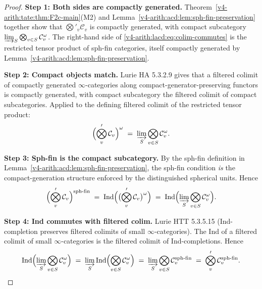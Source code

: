 \begin{proof}
\textbf{Step 1: Both sides are compactly generated.}
Theorem~\ref{v4-arith:tate:thm:F2c-main}(M2) and
Lemma~\ref{v4-arith:acd:lem:sph-fin-preservation} together show that
\(\bigotimes'_{v}\mathcal{C}_{v}\) is compactly generated, with compact
subcategory
\(\varinjlim_{S}\bigotimes_{v\in S}\mathcal{C}_{v}^{\omega}\). The
right-hand side of \eqref{v4-arith:lacd:eq:colim-commutes} is the
restricted tensor product of sph-fin categories, itself compactly
generated by Lemma~\ref{v4-arith:acd:lem:sph-fin-preservation}.

\textbf{Step 2: Compact objects match.} Lurie HA 5.3.2.9 gives that
a filtered colimit of compactly generated \(\infty\)-categories
along compact-generator-preserving functors is compactly generated,
with compact subcategory the filtered colimit of compact
subcategories. Applied to the defining filtered colimit of the
restricted tensor product:
\begin{equation}
\Bigl(\bigotimes_{v}^{\prime}\mathcal{C}_{v}\Bigr)^{\omega}
\;=\;\varinjlim_{S}\bigotimes_{v\in S}\mathcal{C}_{v}^{\omega}.
\end{equation}

\textbf{Step 3: Sph-fin is the compact subcategory.} By the sph-fin
definition in
Lemma~\ref{v4-arith:acd:lem:sph-fin-preservation}, the sph-fin condition
\emph{is} the compact-generation structure enforced by the
distinguished spherical units. Hence
\begin{equation}
\Bigl(\bigotimes_{v}^{\prime}\mathcal{C}_{v}\Bigr)^{\mathrm{sph\text{-}fin}}
\;=\;\mathrm{Ind}\Bigl(\bigl(\bigotimes_{v}^{\prime}\mathcal{C}_{v}\bigr)^{\omega}\Bigr)
\;=\;\mathrm{Ind}\Bigl(\varinjlim_{S}\bigotimes_{v\in S}\mathcal{C}_{v}^{\omega}\Bigr).
\end{equation}

\textbf{Step 4: Ind commutes with filtered colim.} Lurie HTT 5.3.5.15
(Ind-completion preserves filtered colimits of small
\(\infty\)-categories). The Ind of a filtered colimit of small
\(\infty\)-categories is the filtered colimit of Ind-completions.
Hence
\begin{equation}
\mathrm{Ind}\Bigl(\varinjlim_{S}\bigotimes_{v\in S}\mathcal{C}_{v}^{\omega}\Bigr)
\;=\;\varinjlim_{S}\mathrm{Ind}\Bigl(\bigotimes_{v\in S}\mathcal{C}_{v}^{\omega}\Bigr)
\;=\;\varinjlim_{S}\bigotimes_{v\in S}\mathcal{C}_{v}^{\mathrm{sph\text{-}fin}}
\;=\;\bigotimes_{v}^{\prime}\mathcal{C}_{v}^{\mathrm{sph\text{-}fin}}.
\end{equation}


\end{proof}
